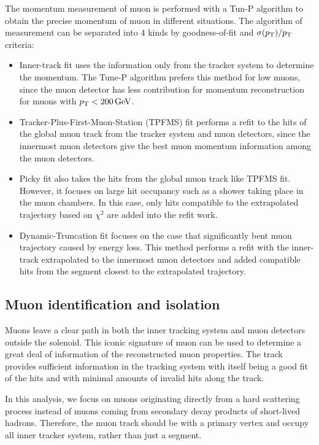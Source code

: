 The momentum measurement of muon is performed with a Tun-P algorithm to obtain the precise momentum of muon in different situations.
The algorithm of \PT measurement can be separated into 4 kinds by goodness-of-fit and $\sigma(p_{\mathrm{T}})/p_{\mathrm{T}}$ criteria:

\begin{itemize}
    \item Inner-track fit uses the information only from the tracker system to determine the momentum.
        The Tune-P algorithm prefers this method for low \PT muons, since the muon detector has less contribution for momentum reconstruction for muons with $p_{\mathrm{T}} < 200 \,\text{Ge\hspace{-.08em}V}$.
    \item Tracker-Plus-First-Muon-Station (TPFMS) fit performs a refit to the hits of the global muon track from the tracker system and muon detectors, since the innermost muon detectors give the best muon momentum information among the muon detectors.
    \item Picky fit also takes the hits from the global muon track like TPFMS fit.
        However, it focuses on large hit occupancy such as a shower taking place in the muon chambers.
        In this case, only hits compatible to the extrapolated trajectory based on $\chi^2$ are added into the refit work.
    \item Dynamic-Truncation fit focuses on the case that significantly bent muon trajectory caused by energy loss.
        This method performs a refit with the inner-track extrapolated to the innermost muon detectors and added compatible hits from the segment closest to the extrapolated trajectory.
\end{itemize}

\subsection{Muon identification and isolation}
Muons leave a clear path in both the inner tracking system and muon detectors outside the solenoid.
This iconic signature of muon can be used to determine a great deal of information of the reconstructed muon properties.
The track provides sufficient information in the tracking system with itself being a good fit of the hits and with minimal amounts of invalid hits along the track.

In this analysis, we focus on muons originating directly from a hard scattering process instead of muons coming from secondary decay products of short-lived hadrons.
Therefore, the muon track should be with a primary vertex and occupy all inner tracker system, rather than just a segment.


